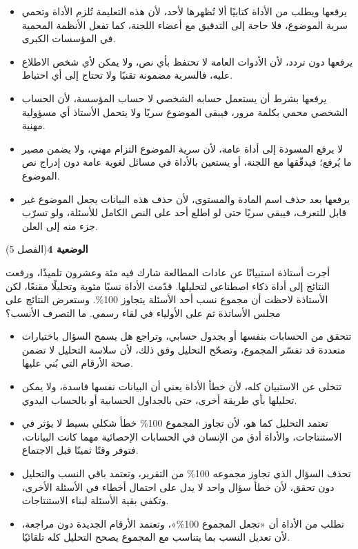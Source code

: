 \documentclass[11pt,a4paper]{article}
\begin{document}
\begin{itemize}[leftmargin=1.0cm, labelsep=6pt, itemsep=3pt, topsep=4pt, parsep=0pt]
  \item[\textbf{أ)}] يرفعها ويطلب من الأداة كتابيًا ألا تُظهرها لأحد، لأن هذه التعليمة تُلزم الأداة وتحمي سرية الموضوع، فلا حاجة إلى التدقيق مع أعضاء اللجنة، كما تفعل الأنظمة المحمية في المؤسسات الكبرى.
  \item[\textbf{ب)}] يرفعها دون تردد، لأن الأدوات العامة لا تحتفظ بأي نص، ولا يمكن لأي شخص الاطلاع عليه، فالسرية مضمونة تقنيًا ولا تحتاج إلى أي احتياط.
  \item[\textbf{ج)}] يرفعها بشرط أن يستعمل حسابه الشخصي لا حساب المؤسسة، لأن الحساب الشخصي محمي بكلمة مرور، فيبقى الموضوع سريًا ولا يتحمل الأستاذ أي مسؤولية مهنية.
  \item[\textbf{د)}] لا يرفع المسودة إلى أداة عامة، لأن سرية الموضوع التزام مهني، ولا يضمن مصير ما يُرفع؛ فيدقّقها مع اللجنة، أو يستعين بالأداة في مسائل لغوية عامة دون إدراج نص الموضوع.
  \item[\textbf{هـ)}] يرفعها بعد حذف اسم المادة والمستوى، لأن حذف هذه البيانات يجعل الموضوع غير قابل للتعرف، فيبقى سريًا حتى لو اطلع أحد على النص الكامل للأسئلة، ولو تسرّب جزء منه إلى العلن.
\end{itemize}
\par\vspace{6pt}
\noindent
{\large\khatt\textbf{الوضعية 4}}\hfill{\small(الفصل 5)}\par\nopagebreak\vspace{3pt}
\setlength{\fboxsep}{7pt}\colorbox{gray!10}{\parbox{\dimexpr\linewidth-14pt}{أجرت أستاذة استبيانًا عن عادات المطالعة شارك فيه مئة وعشرون تلميذًا، ورفعت النتائج إلى أداة ذكاء اصطناعي لتحليلها. قدّمت الأداة نسبًا مئوية وتحليلًا مقنعًا، لكن الأستاذة لاحظت أن مجموع نسب أحد الأسئلة يتجاوز 100\%. وستعرض النتائج على مجلس الأساتذة ثم على الأولياء في لقاء رسمي. ما التصرف الأنسب؟}}\par\nopagebreak
\begin{itemize}[leftmargin=1.0cm, labelsep=6pt, itemsep=3pt, topsep=4pt, parsep=0pt]
  \item[\textbf{أ)}] تتحقق من الحسابات بنفسها أو بجدول حسابي، وتراجع هل يسمح السؤال باختيارات متعددة قد تفسّر المجموع، وتصحّح التحليل وفق ذلك، لأن سلاسة التحليل لا تضمن صحة الأرقام التي بُني عليها.
  \item[\textbf{ب)}] تتخلى عن الاستبيان كله، لأن خطأ الأداة يعني أن البيانات نفسها فاسدة، ولا يمكن تحليلها بأي طريقة أخرى، حتى بالجداول الحسابية أو بالحساب اليدوي.
  \item[\textbf{ج)}] تعتمد التحليل كما هو، لأن تجاوز المجموع 100\% خطأ شكلي بسيط لا يؤثر في الاستنتاجات، والأداة أدق من الإنسان في الحسابات الإحصائية مهما كانت البيانات، فتوفر وقتًا ثمينًا قبل الاجتماع.
  \item[\textbf{د)}] تحذف السؤال الذي تجاوز مجموعه 100\% من التقرير، وتعتمد باقي النسب والتحليل دون تحقق، لأن خطأ سؤال واحد لا يدل على احتمال أخطاء في الأسئلة الأخرى، وتكفي بقية الأسئلة لبناء الاستنتاجات.
  \item[\textbf{هـ)}] تطلب من الأداة أن «تجعل المجموع 100\%»، وتعتمد الأرقام الجديدة دون مراجعة، لأن تعديل النسب بما يتناسب مع المجموع يصحح التحليل كله تلقائيًا.
\end{itemize}
\end{document}
